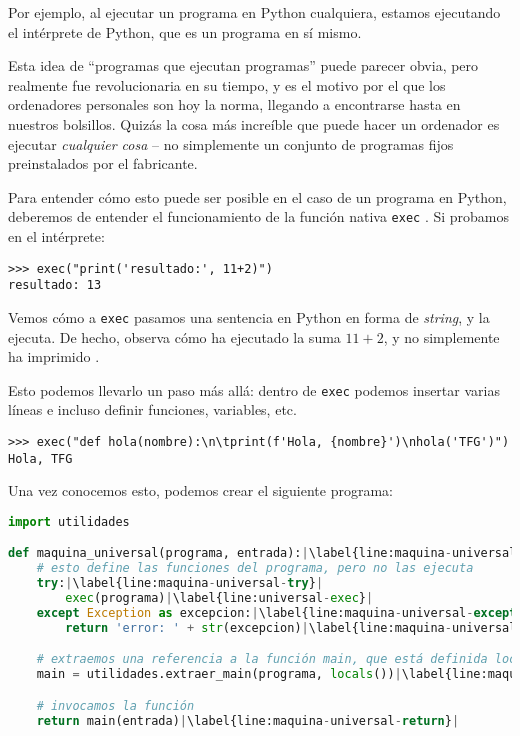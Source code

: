 Por ejemplo, al ejecutar un programa en Python cualquiera, estamos ejecutando el intérprete de Python, que es un programa en sí mismo.

Esta idea de ``programas que ejecutan programas'' puede parecer obvia, pero realmente fue revolucionaria en su tiempo, y es el motivo por el que los ordenadores personales son hoy la norma, llegando a encontrarse hasta en nuestros bolsillos. Quizás la cosa más increíble que puede hacer un ordenador es ejecutar \emph{cualquier cosa} -- no simplemente un conjunto de programas fijos preinstalados por el fabricante.

Para entender cómo esto puede ser posible en el caso de un programa en Python, deberemos de entender el funcionamiento de la función nativa \texttt{exec} \cite{Lutz2013}. Si probamos en el intérprete:
\begin{lstlisting}[numbers=none,frame=none]
>>> exec("print('resultado:', 11+2)")
resultado: 13
\end{lstlisting}
Vemos cómo a \texttt{exec} pasamos una sentencia en Python en forma de \emph{string}, y la ejecuta. De hecho, observa cómo ha ejecutado la suma $11+2$, y no simplemente ha imprimido .

Esto podemos llevarlo un paso más allá: dentro de \texttt{exec} podemos insertar varias líneas e incluso definir funciones, variables, etc.
\begin{lstlisting}[numbers=none,frame=none]
>>> exec("def hola(nombre):\n\tprint(f'Hola, {nombre}')\nhola('TFG')")
Hola, TFG
\end{lstlisting}
\vspace{-8pt}
Una vez conocemos esto, podemos crear el siguiente programa:
\vspace{8pt}
\begin{lstlisting}[language=Python, caption=\lstinline{maquina_universal.py},label={lst:maquina-universal}]
import utilidades

def maquina_universal(programa, entrada):|\label{line:maquina-universal-main}|
    # esto define las funciones del programa, pero no las ejecuta
    try:|\label{line:maquina-universal-try}|
        exec(programa)|\label{line:universal-exec}|
    except Exception as excepcion:|\label{line:maquina-universal-except}|
        return 'error: ' + str(excepcion)|\label{line:maquina-universal-except-return}|

    # extraemos una referencia a la función main, que está definida localmente
    main = utilidades.extraer_main(programa, locals())|\label{line:maquina-universal-main-ref}|

    # invocamos la función
    return main(entrada)|\label{line:maquina-universal-return}|
\end{lstlisting}

